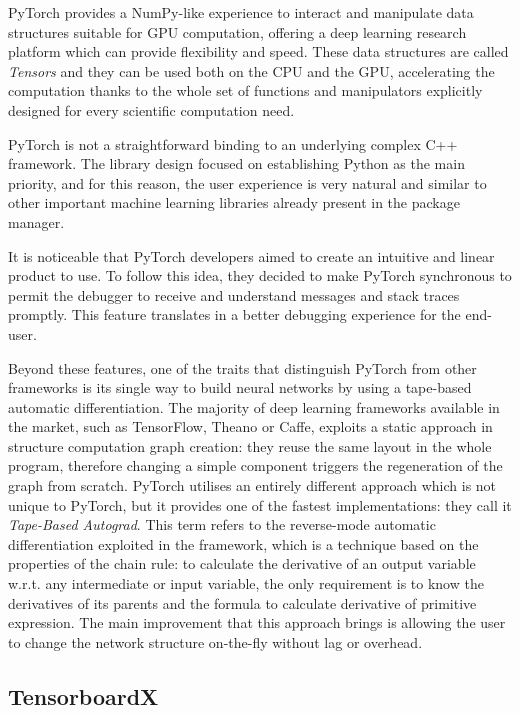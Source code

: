 PyTorch provides a NumPy-like experience to interact and manipulate data structures suitable for GPU computation, offering a deep learning research platform which can provide flexibility and speed. These data structures are called \textit{Tensors} and they can be used both on the CPU and the GPU, accelerating the computation thanks to the whole set of functions and manipulators explicitly designed for every scientific computation need.

PyTorch is not a straightforward binding to an underlying complex C++ framework. The library design focused on establishing Python as the main priority, and for this reason, the user experience is very natural and similar to other important machine learning libraries already present in the package manager.

It is noticeable that PyTorch developers aimed to create an intuitive and linear product to use. To follow this idea, they decided to make PyTorch synchronous to permit the debugger to receive and understand messages and stack traces promptly. This feature translates in a better debugging experience for the end-user.

Beyond these features, one of the traits that distinguish PyTorch from other frameworks is its single way to build neural networks by using a tape-based automatic differentiation.
The majority of deep learning frameworks available in the market, such as TensorFlow, Theano or Caffe, exploits a static approach in structure computation graph creation: they reuse the same layout in the whole program, therefore changing a simple component triggers the regeneration of the graph from scratch.
PyTorch utilises an entirely different approach which is not unique to PyTorch, but it provides one of the fastest implementations: they call it \textit{Tape-Based Autograd}.
This term refers to the reverse-mode automatic differentiation exploited in the framework, which is a technique based on the properties of the chain rule: to calculate the derivative of an output variable w.r.t. any intermediate or input variable, the only requirement is to know the derivatives of its parents and the formula to calculate derivative of primitive expression.
The main improvement that this approach brings is allowing the user to change the network structure on-the-fly without lag or overhead.

\subsection{TensorboardX}

